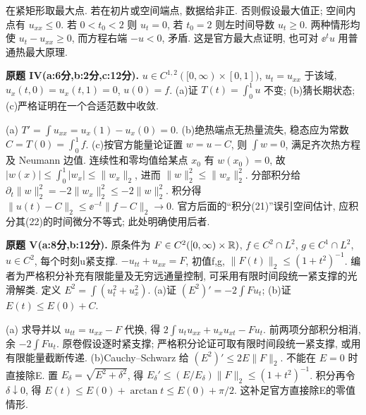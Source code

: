 \begin{solution}
在紧矩形取最大点. 若在初片或空间端点, 数据给非正. 否则假设最大值正; 空间内点有 $u_{xx}\le0$. 若 $0<t_0<2$ 则 $u_t=0$, 若 $t_0=2$ 则左时间导数 $u_t\ge0$. 两种情形均使 $u_t-u_{xx}\ge0$, 而方程右端 $-u<0$, 矛盾. 这是官方最大点证明, 也可对 $\ee^tu$ 用普通热最大原理.
\end{solution}
\begin{exercise}\label{exam:mIV}
\textbf{原题 IV(a:6分,b:2分,c:12分).} $u\in C^{1,2}([0,\infty)\times[0,1])$, $u_t=u_{xx}$ 于该域, $u_x(t,0)=u_x(t,1)=0$, $u(0)=f$. (a)证 $T(t)=\int_0^1u$ 不变; (b)猜长期状态; (c)严格证明在一个合适范数中收敛.
\end{exercise}
\begin{solution}
(a) $T'=\int u_{xx}=u_x(1)-u_x(0)=0$.
(b)绝热端点无热量流失, 稳态应为常数 $C=T(0)=\int_0^1f$.
(c)按官方能量论证置 $w=u-C$, 则 $\int w=0$, 满足齐次热方程及 Neumann 边值. 连续性和零均值给某点 $x_0$ 有 $w(x_0)=0$, 故 $|w(x)|\le\int_0^1|w_x|\le\|w_x\|_2$, 进而 $\|w\|_2^2\le\|w_x\|_2^2$. 分部积分给 $\partial_t\|w\|_2^2=-2\|w_x\|_2^2\le-2\|w\|_2^2$. 积分得 $\|u(t)-C\|_2\le\ee^{-t}\|f-C\|_2\to0$. 官方后面的“积分(21)”误引空间估计, 应积分其(22)的时间微分不等式; 此处明确使用后者.
\end{solution}
\begin{exercise}\label{exam:mV}
\textbf{原题 V(a:8分,b:12分).} 原条件为 $F\in C^2([0,\infty)\times\mathbb R)$, $f\in C^2\cap L^2$, $g\in C^1\cap L^2$, $u\in C^2$, 每个时刻u紧支撑. $-u_{tt}+u_{xx}=F$, 初值f,g, $\|F(t)\|_2\le(1+t^2)^{-1}$. 编者为严格积分补充有限能量及无穷远通量控制, 可采用有限时间段统一紧支撑的光滑解类. 定义 $E^2=\int(u_t^2+u_x^2)$. (a)证 $(E^2)'=-2\int Fu_t$; (b)证 $E(t)\le E(0)+C$.
\end{exercise}
\begin{solution}
(a) 求导并以 $u_{tt}=u_{xx}-F$ 代换, 得 $2\int u_tu_{xx}+u_xu_{xt}-Fu_t$. 前两项分部积分相消, 余 $-2\int Fu_t$. 原卷假设逐时紧支撑; 严格积分论证可取有限时间段统一紧支撑, 或用有限能量截断传递.
(b)Cauchy--Schwarz 给 $(E^2)'\le2E\|F\|_2$. 不能在 $E=0$ 时直接除E. 置 $E_\delta=\sqrt{E^2+\delta^2}$, 得 $E_\delta'\le(E/E_\delta)\|F\|_2\le(1+t^2)^{-1}$. 积分再令 $\delta\downarrow0$, 得 $E(t)\le E(0)+\arctan t\le E(0)+\pi/2$. 这补足官方直接除E的零值情形.
\end{solution}
